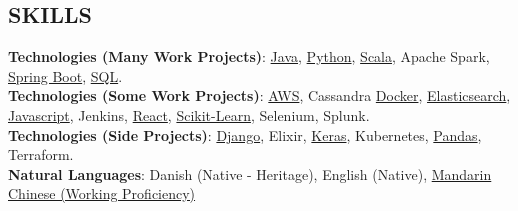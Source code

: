 \documentclass[margin]{res}
\begin{document}
\begin{resume}




\section{SKILLS}

\textbf{Technologies (Many Work Projects)}:
\href{https://www.lucaskjaerozhang.com/tags/java/}{Java},
\href{https://www.lucaskjaerozhang.com/tags/python/}{Python},
\href{https://www.lucaskjaerozhang.com/tags/scala/}{Scala},
Apache Spark,
\href{https://www.lucaskjaerozhang.com/tags/spring%20boot/}{Spring Boot},
\href{https://www.lucaskjaerozhang.com/tags/sql/}{SQL}.
\\
\textbf{Technologies (Some Work Projects)}:
\href{https://www.lucaskjaerozhang.com/tags/aws/}{AWS},
Cassandra
\href{https://www.lucaskjaerozhang.com/tags/docker/}{Docker},
\href{https://www.lucaskjaerozhang.com/tags/elasticsearch/}{Elasticsearch},
\href{https://www.lucaskjaerozhang.com/tags/javascript/}{Javascript},
Jenkins,
\href{https://www.lucaskjaerozhang.com/tags/react/}{React},
\href{https://www.lucaskjaerozhang.com/tags/sklearn/}{Scikit-Learn},
Selenium,
Splunk.
\\
\textbf{Technologies (Side Projects)}:
\href{https://www.lucaskjaerozhang.com/tags/django/}{Django},
Elixir,
\href{https://www.lucaskjaerozhang.com/tags/keras/}{Keras},
Kubernetes,
\href{https://www.lucaskjaerozhang.com/tags/pandas/}{Pandas},
Terraform.
\\
\textbf{Natural Languages}: Danish (Native - Heritage), English (Native), \href{https://www.lucaskjaerozhang.com/lucas-kjaero-zhang-%E4%B8%AA%E4%BA%BA%E7%AE%80%E5%8E%86.pdf}{Mandarin Chinese (Working Proficiency)}


\end{resume}
\end{document}
